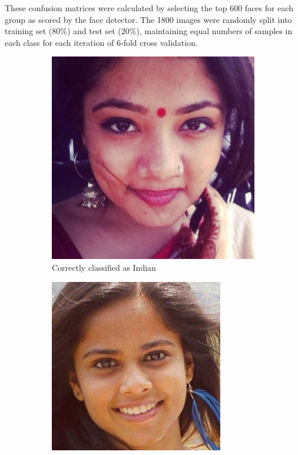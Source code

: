These confusion matrices were calculated by selecting the top 600 faces for
each group as scored by the face detector. The 1800 images were randomly split
into training set (80\%) and test set (20\%), maintaining equal numbers of
samples in each class for each iteration of 6-fold cross validation. 

\begin{figure}[!htb]
    \centering
    \begin{subfigure}[t]{0.3\textwidth}
      \includegraphics[width=\textwidth]{figures/results/misclassification/india-india.jpg}
      \caption{Correctly classified as Indian}
    \end{subfigure}
    \begin{subfigure}[t]{0.3\textwidth}
      \includegraphics[width=\textwidth]{figures/results/misclassification/india-brazil.jpg}

\end{subfigure}
\end{figure}

